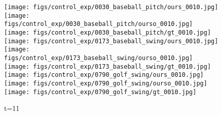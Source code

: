 \documentclass{article}
\begin{document}
\begin{appendix}
\begin{figure*}[!thbp]
    \centering
    \vspace{20pt}
	\begin{subfigure}{0.04\linewidth}
        \raggedleft
    \end{subfigure}
    \begin{subfigure}{0.12\linewidth}
        \caption*{t=11}
        \vspace{-7pt}
	    \texttt{[image: figs/control\_exp/0030\_baseball\_pitch/ours\_0010.jpg]}
	    \texttt{[image: figs/control\_exp/0030\_baseball\_pitch/ourso\_0010.jpg]}
	    \vspace{.2cm}
  		\texttt{[image: figs/control\_exp/0030\_baseball\_pitch/gt\_0010.jpg]}
  		\texttt{[image: figs/control\_exp/0173\_baseball\_swing/ours\_0010.jpg]}
  		\texttt{[image: figs/control\_exp/0173\_baseball\_swing/ourso\_0010.jpg]}
  		\vspace{.2cm}
  		\texttt{[image: figs/control\_exp/0173\_baseball\_swing/gt\_0010.jpg]}
  		\texttt{[image: figs/control\_exp/0790\_golf\_swing/ours\_0010.jpg]}
  		\texttt{[image: figs/control\_exp/0790\_golf\_swing/ourso\_0010.jpg]}
  		\vspace{.2cm}
  		\texttt{[image: figs/control\_exp/0790\_golf\_swing/gt\_0010.jpg]}

\end{subfigure}
\end{figure*}
\end{appendix}
\end{document}
